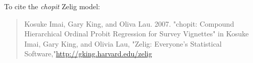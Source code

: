To cite the \emph{ chopit } Zelig model:
 \begin{verse}
 Kosuke Imai, Gary King, and Oliva Lau. 2007. "chopit: Compound Hierarchical Ordinal Probit Regression for Survey Vignettes" in Kosuke Imai, Gary King, and Olivia Lau, "Zelig: Everyone's Statistical Software,"\url{http://gking.harvard.edu/zelig} 
\end{verse}